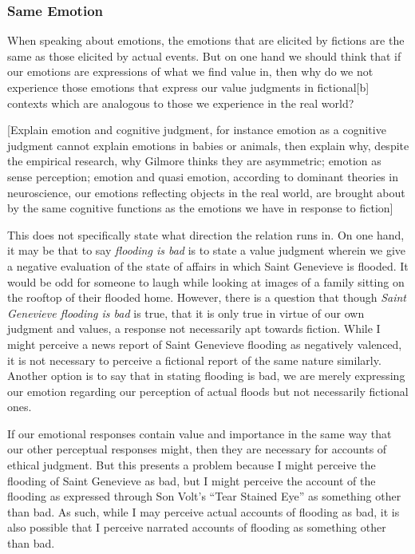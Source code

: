 \documentclass[phdthesis,12pt,final]{wuthesis}
\theoremstyle{definition}
\theoremstyle{definition}
\theoremstyle{definition}
\theoremstyle{definition}
\theoremstyle{remark}
\begin{document}
\subsubsection*{Same Emotion}\label{same-emotion}

When speaking about emotions, the emotions that are elicited by fictions are the same as those elicited by actual events. But on one hand we should think that if our emotions are expressions of what we find value in, then why do we not experience those emotions that express our value judgments in fictional{[}b{]} contexts which are analogous to those we experience in the real world?

{[}Explain emotion and cognitive judgment, for instance emotion as a cognitive judgment cannot explain emotions in babies or animals, then explain why, despite the empirical research, why Gilmore thinks they are asymmetric; emotion as sense perception; emotion and quasi emotion, according to dominant theories in neuroscience, our emotions reflecting objects in the real world, are brought about by the same cognitive functions as the emotions we have in response to fiction{]}

This does not specifically state what direction the relation runs in. On one hand, it may be that to say \emph{flooding is bad} is to state a value judgment wherein we give a negative evaluation of the state of affairs in which Saint Genevieve is flooded. It would be odd for someone to laugh while looking at images of a family sitting on the rooftop of their flooded home. However, there is a question that though \emph{Saint Genevieve flooding is bad} is true, that it is only true in virtue of our own judgment and values, a response not necessarily apt towards fiction. While I might perceive a news report of Saint Genevieve flooding as negatively valenced, it is not necessary to perceive a fictional report of the same nature similarly. Another option is to say that in stating flooding is bad, we are merely expressing our emotion regarding our perception of actual floods but not necessarily fictional ones.

If our emotional responses contain value and importance in the same way that our other perceptual responses might, then they are necessary for accounts of ethical judgment. But this presents a problem because I might perceive the flooding of Saint Genevieve as bad, but I might perceive the account of the flooding as expressed through Son Volt's ``Tear Stained Eye'' as something other than bad. As such, while I may perceive actual accounts of flooding as bad, it is also possible that I perceive narrated accounts of flooding as something other than bad.
\end{document}
